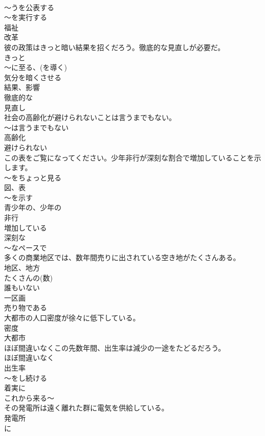 \documentclass[8pt]{extreport}
\begin{document}
\begin{CJK}{UTF8}{min}
\\	～うを公表する 
\\	～を実行する 
\\	福祉 
\\	改革
\\	彼の政策はきっと暗い結果を招くだろう。徹底的な見直しが必要だ。	
\\	きっと 
\\	～に至る、(を導く) 
\\	気分を暗くさせる 
\\	結果、影響 
\\	徹底的な 
\\	見直し
\\	社会の高齢化が避けられないことは言うまでもない。	
\\	～は言うまでもない 
\\	高齢化 
\\	避けられない
\\	この表をご覧になってください。少年非行が深刻な割合で増加していることを示します。	
\\	～をちょっと見る 
\\	図、表 
\\	～を示す 
\\	青少年の、少年の 
\\	非行 
\\	増加している 
\\	深刻な 
\\	～なペースで
\\	多くの商業地区では、数年間売りに出されている空き地がたくさんある。	
\\	地区、地方 
\\	たくさんの(数) 
\\	誰もいない 
\\	一区画 
\\	売り物である
\\	大都市の人口密度が徐々に低下している。	
\\	密度 
\\	大都市
\\	ほぼ間違いなくこの先数年間、出生率は減少の一途をたどるだろう。	
\\	ほぼ間違いなく 
\\	出生率 
\\	～をし続ける 
\\	着実に 
\\	これから来る～
\\	その発電所は遠く離れた群に電気を供給している。	
\\	発電所 
\\	に

\end{CJK}
\end{document}
